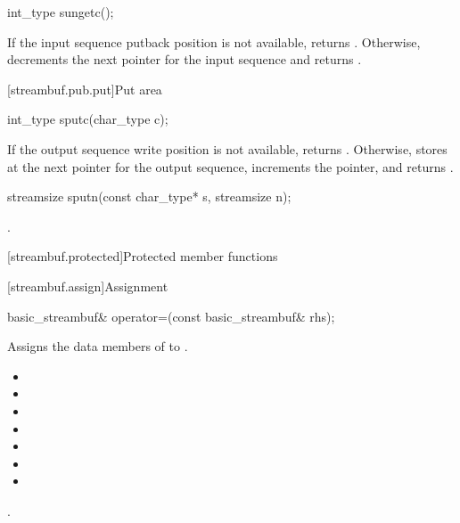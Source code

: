 %
\begin{itemdecl}
int_type sungetc();
\end{itemdecl}

\begin{itemdescr}
\pnum
\returns
If the input sequence putback position is not available,
returns
.
Otherwise, decrements the next pointer for the input sequence and
returns
.
\end{itemdescr}

[streambuf.pub.put]{Put area}

%
\begin{itemdecl}
int_type sputc(char_type c);
\end{itemdecl}

\begin{itemdescr}
\pnum
\returns
If the output sequence write position is not available,
returns
.
Otherwise, stores  at the next pointer for the output sequence,
increments the pointer, and
returns
.
\end{itemdescr}

%
\begin{itemdecl}
streamsize sputn(const char_type* s, streamsize n);
\end{itemdecl}

\begin{itemdescr}
\pnum
\returns
{}.
\end{itemdescr}

[streambuf.protected]{Protected member functions}

[streambuf.assign]{Assignment}

%
\begin{itemdecl}
basic_streambuf& operator=(const basic_streambuf& rhs);
\end{itemdecl}

\begin{itemdescr}
\pnum
\effects Assigns the data members of 
to .

\pnum
\ensures

\begin{itemize}
\item {}
\item {}
\item {}
\item {}
\item {}
\item {}
\item {}
\end{itemize}

\pnum
\returns {}.
\end{itemdescr}

